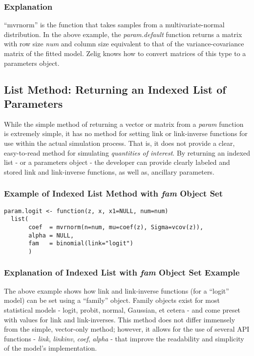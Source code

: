 \documentclass[a4paper,11pt]{article}
\begin{document}
\subsubsection{Explanation}
``mvrnorm'' is the function that takes samples from a multivariate-normal distribution.  In the above example, the \emph{param.default} function returns a matrix with row size \emph{num} and column size equivalent to that of the variance-covariance matrix of the fitted model.  Zelig knows how to convert matrices of this type to a parameters object.



\subsection{List Method: Returning an Indexed List of Parameters}

While the simple method of returning a vector or matrix from a \emph{param} function is extremely simple, it has no method for setting link or link-inverse functions for use within the actual simulation process.  That is, it does not provide a clear, easy-to-read method for simulating \emph{quantities of interest}.  By returning an indexed list - or a parameters object - the developer can provide clearly labeled and stored link and link-inverse functions, as well as, ancillary parameters.


\subsubsection{Example of Indexed List Method with \emph{fam} Object Set}

\begin{verbatim}
param.logit <- function(z, x, x1=NULL, num=num)
  list(
       coef  = mvrnorm(n=num, mu=coef(z), Sigma=vcov(z)),
       alpha = NULL,
       fam   = binomial(link="logit")
       )
\end{verbatim}


\subsubsection{Explanation of Indexed List with \emph{fam} Object Set Example}

The above example shows how link and link-inverse functions (for a ``logit'' model) can be set using a ``family'' object.  Family objects exist for most statistical models - logit, probit, normal, Gaussian, et cetera - and come preset with values for link and link-inverses.  This method does not differ immensely from the simple, vector-only method; however, it allows for the use of several API functions - \emph{link}, \emph{linkinv}, \emph{coef}, \emph{alpha} - that improve the readability and simplicity of the model's implementation.
\end{document}
